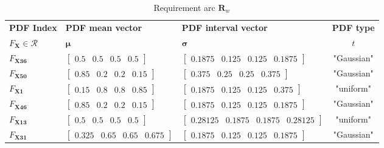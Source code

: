 \begin{table}[h!]
	\centering
	\renewcommand{\arraystretch}{1.0}%
	\footnotesize\addtolength{\tabcolsep}{-5pt}
	\caption{Requirement arc $\mathbf{R}_w$}
	\label{table:requirementarcex}
	\begin{tabular}{l>{\centering\arraybackslash}p{4.2cm}>{\centering\arraybackslash}p{6cm}c}
	\hline\hline

	\bf \ac{PDF} Index & \bf \ac{PDF} mean vector & \bf \ac{PDF} interval vector & \bf \ac{PDF} type \\
	$F_\mathbf{X} \in \mathcal{R}$ &$\boldsymbol{\mu}$ & $\boldsymbol{\sigma}$ & $t$ \\ \hline

	\hline
	$F_{\mathbf{X36}}$ & $\begin{bmatrix} 0.5 & 0.5 & 0.5 & 0.5 \end{bmatrix}$ & $\begin{bmatrix} 0.1875 & 0.125 & 0.125 & 0.1875 \end{bmatrix}$ & "Gaussian" \\
	$F_{\mathbf{X50}}$ & $\begin{bmatrix} 0.85 & 0.2 & 0.2 & 0.15 \end{bmatrix}$ & $\begin{bmatrix} 0.375 & 0.25 & 0.25 & 0.375 \end{bmatrix}$ & "Gaussian" \\
	$F_{\mathbf{X1}}$ & $\begin{bmatrix} 0.15 & 0.8 & 0.8 & 0.85 \end{bmatrix}$ & $\begin{bmatrix} 0.1875 & 0.125 & 0.125 & 0.375 \end{bmatrix}$ & "uniform" \\
	$F_{\mathbf{X46}}$ & $\begin{bmatrix} 0.85 & 0.2 & 0.2 & 0.15 \end{bmatrix}$ & $\begin{bmatrix} 0.1875 & 0.125 & 0.125 & 0.1875 \end{bmatrix}$ & "Gaussian" \\
	$F_{\mathbf{X13}}$ & $\begin{bmatrix} 0.5 & 0.5 & 0.5 & 0.5 \end{bmatrix}$ & $\begin{bmatrix} 0.28125 & 0.1875 & 0.1875 & 0.28125 \end{bmatrix}$ & "uniform" \\
	$F_{\mathbf{X31}}$ & $\begin{bmatrix} 0.325 & 0.65 & 0.65 & 0.675 \end{bmatrix}$ & $\begin{bmatrix} 0.1875 & 0.125 & 0.125 & 0.1875 \end{bmatrix}$ & "Gaussian" \\
	\hline\hline
	\end{tabular}\\
\end{table}

